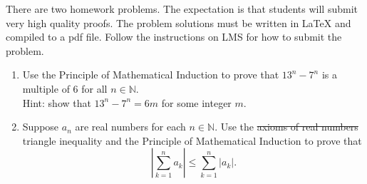 \documentclass{article}
\begin{document}

There are two homework problems. The expectation is that students
will submit very high quality proofs. The problem solutions must be written
in LaTeX and compiled to a pdf file. 
Follow the instructions on LMS for how to submit the problem.

\bigskip
\bigskip


\begin{enumerate}
\item Use the Principle of Mathematical Induction to prove that $13^n - 7^n$ is a multiple of 6 for all $n \in \mathbb{N}$. \\ Hint: show that $13^n - 7^n = 6 m $ for some integer $m$. 

\item Suppose $a_n$ are real numbers for each $n \in \mathbb{N}.$  Use the \sout{axioms of real numbers} triangle inequality and the Principle of Mathematical Induction to prove that $$\left|\sum_{k=1}^na_k\right| \leq \sum_{k=1}^n|a_k|.$$\\
\end{enumerate}
\end{document}
